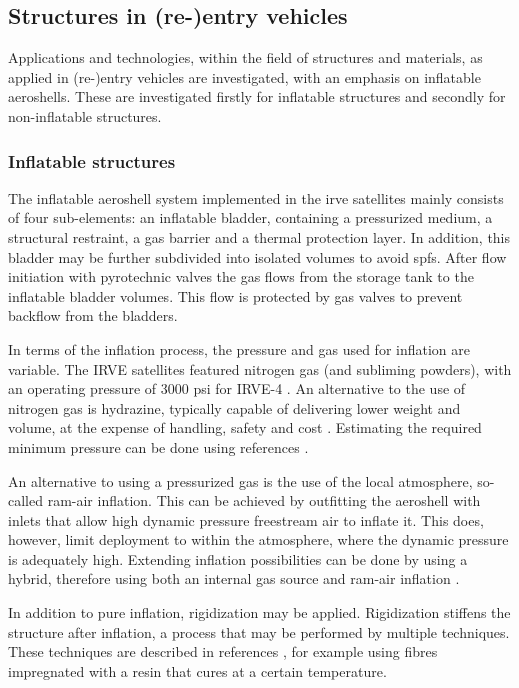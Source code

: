 \subsection{Structures in (re-)entry vehicles}\label{sec:struc}
Applications and technologies, within the field of structures and materials, as applied in (re-)entry vehicles are investigated, with an emphasis on inflatable aeroshells. These are investigated firstly for inflatable structures and secondly for non-inflatable structures.

\subsubsection{Inflatable structures}
The inflatable aeroshell system implemented in the \gls{irve} satellites mainly consists of four sub-elements: an inflatable bladder, containing a pressurized medium, a structural restraint, a gas barrier and a thermal protection layer. In addition, this bladder may be further subdivided into isolated volumes to avoid \gls{spfs}. After flow initiation with pyrotechnic valves the gas flows from the storage tank to the inflatable bladder volumes. This flow is protected by gas valves to prevent backflow from the bladders. \cite{Hughes2005} 

In terms of the inflation process, the pressure and gas used for inflation are variable. The IRVE satellites featured nitrogen gas (and subliming powders), with an operating pressure of 3000 psi for IRVE-4 \cite{Litton2011}. An alternative to the use of nitrogen gas is hydrazine, typically capable of delivering lower weight and volume, at the expense of handling, safety and cost \cite{Freeland1998}. Estimating the required minimum pressure can be done using references \cite{Samareh2011, Brown2009}.

An alternative to using a pressurized gas is the use of the local atmosphere, so-called ram-air inflation. This can be achieved by outfitting the aeroshell with inlets that allow high dynamic pressure freestream air to inflate it. This does, however, limit deployment to within the atmosphere, where the dynamic pressure is adequately high. Extending inflation possibilities can be done by using a hybrid, therefore using both an internal gas source and ram-air inflation \cite{Smith2010}.

In addition to pure inflation, rigidization may be applied. Rigidization stiffens the structure after inflation, a process that may be performed by multiple techniques. These techniques are described in references \cite{Freeland1998,Jenkins2001}, for example using fibres impregnated with a resin that cures at a certain temperature. 

